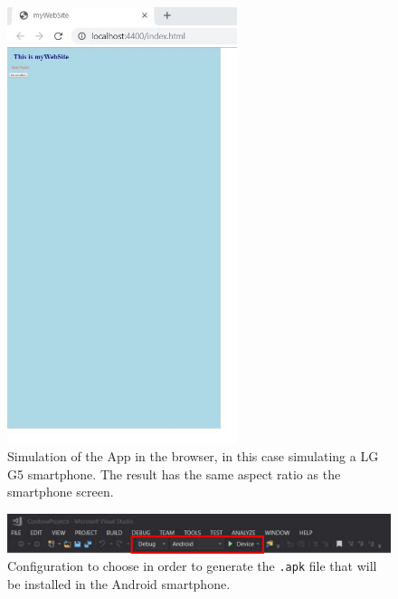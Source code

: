 \begin{figure}
    \centering
    \includegraphics[width= 0.6\textwidth]{Figures/Cordova6}
    \caption{Simulation of the App in the browser, in this case simulating a LG G5 smartphone. The result has the same aspect ratio as the smartphone screen.}
    \label{fig:Cordova6}
\end{figure}

\begin{figure}
    \centering
    \includegraphics[width= \textwidth]{Figures/Cordova7}
    \caption{Configuration to choose in order to generate the \texttt{.apk} file that will be installed in the Android smartphone.}
    \label{fig:Cordova7}
\end{figure}

